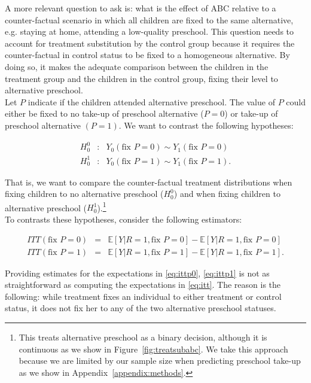 \noindent A more relevant question to ask is: what is the effect of ABC relative to a counter-factual scenario in which all children are fixed to the same alternative, e.g. staying at home, attending a low-quality preschool. This question needs to account for treatment substitution by the control group because it requires the counter-factual in control status to be fixed to a homogeneous alternative. By doing so, it makes the adequate comparison between the children in the treatment group and the children in the control group, fixing their level to alternative preschool.\\

\noindent Let $P$ indicate if the children attended alternative preschool. The value of $P$ could either be fixed to no take-up of preschool alternative ($P = 0$) or take-up of preschool alternative $(P = 1)$. We want to contrast the following hypotheses: 

\begin{eqnarray}
H_{0}^0 &:& Y_{0} \left( \text{fix } P = 0 \right) \sim Y_{1} \left( \text{fix } P = 0 \right) \\
H_{0}^1 &:& Y_{0} \left( \text{fix } P = 1 \right) \sim Y_{1} \left( \text{fix } P = 1\right). 
\end{eqnarray}

\noindent That is, we want to compare the counter-factual treatment distributions when fixing children to no alternative preschool ($H_{0}^0$) and when fixing children to alternative preschool ($H_{0}^1$).\footnote{This treats alternative preschool as a binary decision, although it is continuous as we show in Figure~\ref{fig:treatsubabc}. We take this approach because we are limited by our sample size when predicting preschool take-up as we show in Appendix~\ref{appendix:methods}.}\\

\noindent To contrasts these hypotheses, consider the following estimators: 

\begin{eqnarray}
ITT \left( \text{fix } P = 0 \right) &=& \mathbb{E} \left[ Y | R = 1, \text{fix } P = 0 \right] - \mathbb{E} \left[ Y | R = 1, \text{fix } P = 0 \right] \label{eq:ittp0} \\
ITT \left( \text{fix } P = 1 \right) &=& \mathbb{E} \left[ Y | R = 1, \text{fix } P = 1 \right] - \mathbb{E} \left[ Y | R = 1, \text{fix } P = 1 \right]. \label{eq:ittp1}  
\end{eqnarray}

\noindent Providing estimates for the expectations in \eqref{eq:ittp0}, \eqref{eq:ittp1} is not as straightforward as computing the expectations in \eqref{eq:itt}. The reason is the following: while treatment fixes an individual to either treatment or control status, it does not fix her to any of the two alternative preschool statuses.\\

